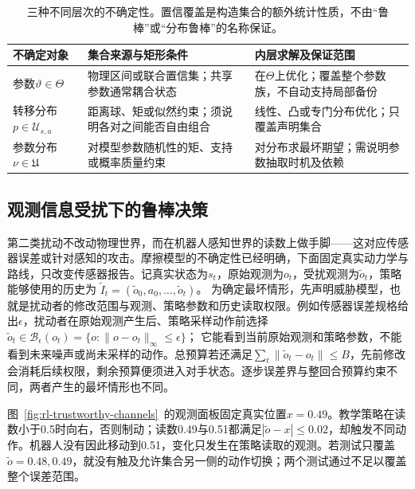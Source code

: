 \begin{table}[htbp]
  \centering
  \begin{tabularx}{\linewidth}{@{}>{\raggedright\arraybackslash}p{20mm}XX@{}}
    \toprule
    不确定对象 & 集合来源与矩形条件 & 内层求解及保证范围 \\
    \midrule
    参数$\vartheta\in\Theta$ & 物理区间或联合置信集；共享参数通常耦合状态 & 在$\Theta$上优化；覆盖整个参数族，不自动支持局部备份 \\
    转移分布$p\in\mathcal U_{s,a}$ & 距离球、矩或似然约束；须说明各对之间能否自由组合 & 线性、凸或专门分布优化；只覆盖声明集合 \\
    参数分布$\nu\in\mathfrak U$ & 对模型参数随机性的矩、支持或概率质量约束 & 对分布求最坏期望；需说明参数抽取时机及依赖 \\
    \bottomrule
  \end{tabularx}
  \caption{三种不同层次的不确定性。置信覆盖是构造集合的额外统计性质，不由“鲁棒”或“分布鲁棒”的名称保证。}
  \label{tab:rl-trustworthy-uncertainty}
\end{table}

\subsection{观测信息受扰下的鲁棒决策}
\label{sec:rl-trustworthy-observation}

第二类扰动不改动物理世界，而在机器人感知世界的读数上做手脚——这对应传感器误差或针对感知的攻击。摩擦模型的不确定性已经明确，下面固定真实动力学与路线，只改变传感器报告。记真实状态为$s_t$，原始观测为$o_t$，受扰观测为$\widetilde o_t$，策略能够使用的历史为
$\widetilde I_t=(\widetilde o_0,a_0,\ldots,\widetilde o_t)$。
为确定最坏情形，先声明威胁模型，也就是扰动者的修改范围与观测、策略参数和历史读取权限。例如传感器误差规格给出$\epsilon$，扰动者在原始观测产生后、策略采样动作前选择
$\widetilde o_t\in\mathcal B_\epsilon(o_t)=\{o:\lVert o-o_t\rVert_\infty\leq\epsilon\}$；
它能看到当前原始观测和策略参数，不能看到未来噪声或尚未采样的动作。总预算若还满足$\sum_t\lVert\widetilde o_t-o_t\rVert\leq B$，先前修改会消耗后续权限，剩余预算便须进入对手状态。逐步误差界与整回合预算约束不同，两者产生的最坏情形也不同。

图~\ref{fig:rl-trustworthy-channels}~的观测面板固定真实位置$x=0.49$。教学策略在读数小于0.5时向右，否则制动；读数0.49与0.51都满足$|\widetilde o-x|\leq0.02$，却触发不同动作。机器人没有因此移动到0.51，变化只发生在策略读取的观测。若测试只覆盖$\widetilde o=0.48,0.49$，就没有触及允许集合另一侧的动作切换；两个测试通过不足以覆盖整个误差范围。

